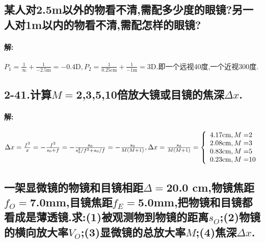 \documentclass[UTF8]{article}
\newcommand{\m}{\mathrm{m}}
\newcommand{\cm}{\mathrm{cm}}
\newcommand{\lipsum}{Lorem ipsum dolor sit amet, consectetur adipisicing elit, sed do eiusmod tempor incididunt ut labore et dolore magna aliqua. Ut enim ad minim veniam, quis nostrud exercitation ullamco laboris nisi ut aliquip ex ea commodo consequat. Duis aute irure dolor in reprehenderit in voluptate velit esse cillum dolore eu fugiat nulla pariatur. Excepteur sint occaecat cupidatat non proident, sunt in culpa qui officia deserunt mollit anim id est laborum.}
\begin{document}
    \setcounter{subsection}{14}
    \subsection{} %

    \setcounter{subsection}{23}
    \subsection{} %

    \setcounter{subsection}{39}
    \subsection{某人对2.5m以外的物看不清,需配多少度的眼镜?另一人对1m以内的物看不清,需配怎样的眼镜?} %
    \paragraph{解: }$P_1=\frac{1}{\infty}+\frac{1}{-2.5\m}=-0.4\mathrm{D},P_2=\frac{1}{0.25\cm}+\frac{1}{-1\m}=3\mathrm{D}.$即一个远视40度,一个近视300度.

    \subsection{2-41.计算$M=$2,3,5,10倍放大镜或目镜的焦深$\Delta x$.} %
    \paragraph{解: }$\Delta x=\frac{f^2}{x}=-\frac{f^2}{s_0+f}=-\frac{s_0}{s^2_0/f^2+s_0/f}=-\frac{s_0}{M(M+1)},\Delta x=\frac{s_0}{M(M+1)}=\left\{ \begin{array}{c@{\cm ,M=}l}
        4.17&2\\2.08&3\\ 0.83&5\\0.23&10\\
    \end{array} \right.$

    \addtocounter{subsection}{1}
    \subsection{一架显微镜的物镜和目镜相距$\Delta=$20.0 cm,物镜焦距$f_O=$7.0mm,目镜焦距$f_E=$5.0mm,把物镜和目镜都看成是薄透镜.求:(1)被观测物到物镜的距离$s_O$;(2)物镜的横向放大率$V_O$;(3)显微镜的总放大率$M$;(4)焦深$\Delta x$.} %
\end{document}
